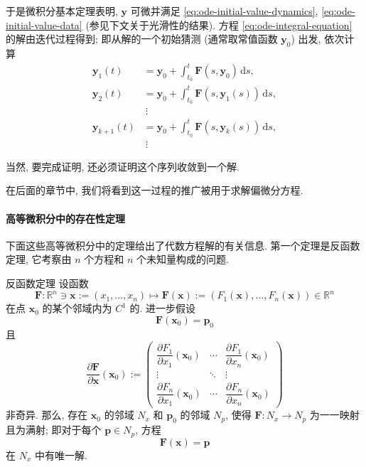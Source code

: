 于是微积分基本定理表明, $\bm{y}$ 可微并满足 \eqref{eq:ode-initial-value-dynamics}, \eqref{eq:ode-initial-value-data} (参见下文关于光滑性的结果). 方程 \eqref{eq:ode-integral-equation} 的解由迭代过程得到; 即从解的一个初始猜测 (通常取常值函数 $\bm{y}_0$) 出发, 依次计算
\begin{equation}\label{eq:picard-iteration}
\begin{aligned}
\bm{y}_1(t)&=\bm{y}_0+\displaystyle\int_{t_0}^t\bm{F}(s,\bm{y}_0)\,\mathrm{d}s,\\
\bm{y}_2(t)&=\bm{y}_0+\displaystyle\int_{t_0}^t\bm{F}(s,\bm{y}_1(s))\,\mathrm{d}s,\\
&\ \vdots\\
\bm{y}_{k+1}(t)&=\bm{y}_0+\displaystyle\int_{t_0}^t\bm{F}(s,\bm{y}_k(s))\,\mathrm{d}s,\\
&\ \vdots
\end{aligned}
\end{equation}

当然, 要完成证明, 还必须证明这个序列收敛到一个解.

在后面的章节中, 我们将看到这一过程的推广被用于求解偏微分方程.

\paragraph*{高等微积分中的存在性定理}

下面这些高等微积分中的定理给出了代数方程解的有关信息. 第一个定理是反函数定理, 它考察由 $n$ 个方程和 $n$ 个未知量构成的问题.

\begin{Theorem}{反函数定理}
\label{thm:inverse-function}
设函数
\[
\bm{F}:\mathbb{R}^n\ni\bm{x}:=(x_1,\ldots,x_n)\mapsto\bm{F}(\bm{x}):=(F_1(\bm{x}),\ldots,F_n(\bm{x}))\in\mathbb{R}^n
\]
在点 $\bm{x}_0$ 的某个邻域内为 $C^1$ 的. 进一步假设
\[
\bm{F}(\bm{x}_0)=\bm{p}_0
\]
且
\[
\dfrac{\partial\bm{F}}{\partial\bm{x}}(\bm{x}_0):=
\begin{pmatrix}
\dfrac{\partial F_1}{\partial x_1}(\bm{x}_0)&\cdots&\dfrac{\partial F_1}{\partial x_n}(\bm{x}_0)\\
\vdots&\ddots&\vdots\\
\dfrac{\partial F_n}{\partial x_1}(\bm{x}_0)&\cdots&\dfrac{\partial F_n}{\partial x_n}(\bm{x}_0)
\end{pmatrix}
\]
非奇异. 那么, 存在 $\bm{x}_0$ 的邻域 $N_x$ 和 $\bm{p}_0$ 的邻域 $N_p$, 使得 $\bm{F}:N_x\to N_p$ 为一一映射且为满射; 即对于每个 $\bm{p}\in N_p$, 方程
\[
\bm{F}(\bm{x})=\bm{p}
\]
在 $N_x$ 中有唯一解.
\end{Theorem}


